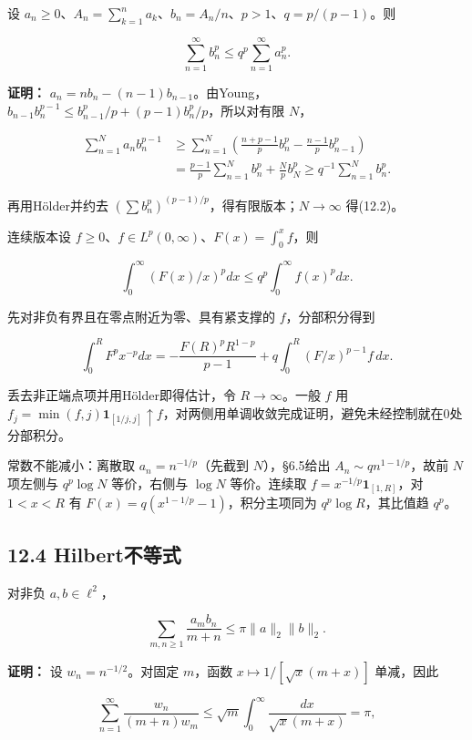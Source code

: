 \documentclass[11pt,a4paper]{article}
\begin{document}
设
\(a_n\ge0\)、\(A_n=\sum_{k=1}^na_k\)、\(b_n=A_n/n\)、\(p>1\)、\(q=p/(p-1)\)。则

\[
\sum_{n=1}^\infty b_n^p\le q^p\sum_{n=1}^\infty a_n^p.\tag{12.2}
\]

\textbf{证明：}
\(a_n=nb_n-(n-1)b_{n-1}\)。由Young，\(b_{n-1}b_n^{p-1}\le b_{n-1}^p/p+(p-1)b_n^p/p\)，所以对有限
\(N\)，

\[
\begin{aligned}
\sum_{n=1}^Na_nb_n^{p-1}
&\ge\sum_{n=1}^N\left(\frac{n+p-1}{p}b_n^p-\frac{n-1}{p}b_{n-1}^p\right)\\
&=\frac{p-1}{p}\sum_{n=1}^Nb_n^p+\frac Np b_N^p
\ge q^{-1}\sum_{n=1}^Nb_n^p.
\end{aligned}
\]

再用Hölder并约去
\(\left(\sum b_n^p\right)^{(p-1)/p}\)，得有限版本；\(N\to\infty\)
得(12.2)。

连续版本设 \(f\ge0\)、\(f\in L^p(0,\infty)\)、\(F(x)=\int_0^xf\)，则

\[
\int_0^\infty(F(x)/x)^pdx\le q^p\int_0^\infty f(x)^pdx.\tag{12.3}
\]

先对非负有界且在零点附近为零、具有紧支撑的 \(f\)，分部积分得到

\[
\int_0^R F^px^{-p}dx
=-\frac{F(R)^pR^{1-p}}{p-1}
+q\int_0^R(F/x)^{p-1}f\,dx.
\]

丢去非正端点项并用Hölder即得估计，令 \(R\to\infty\)。一般 \(f\) 用
\(f_j=\min(f,j)\mathbf1_{[1/j,j]}\uparrow f\)，对两侧用单调收敛完成证明，避免未经控制就在0处分部积分。

常数不能减小：离散取 \(a_n=n^{-1/p}\)（先截到 \(N\)），§6.5给出
\(A_n\sim qn^{1-1/p}\)，故前 \(N\) 项左侧与 \(q^p\log N\) 等价，右侧与
\(\log N\) 等价。连续取 \(f=x^{-1/p}\mathbf1_{[1,R]}\)，对 \(1<x<R\) 有
\(F(x)=q(x^{1-1/p}-1)\)，积分主项同为 \(q^p\log R\)，其比值趋 \(q^p\)。

\subsection{12.4 Hilbert不等式}\label{hilbertux4e0dux7b49ux5f0f}

对非负 \(a,b\in\ell^2\)，

\[
\sum_{m,n\ge1}\frac{a_mb_n}{m+n}\le\pi\|a\|_2\|b\|_2.\tag{12.4}
\]

\textbf{证明：} 设 \(w_n=n^{-1/2}\)。对固定 \(m\)，函数
\(x\mapsto1/[\sqrt{x}(m+x)]\) 单减，因此

\[
\sum_{n=1}^\infty\frac{w_n}{(m+n)w_m}
\le\sqrt m\int_0^\infty\frac{dx}{\sqrt x(m+x)}=\pi,
\]
\end{document}
